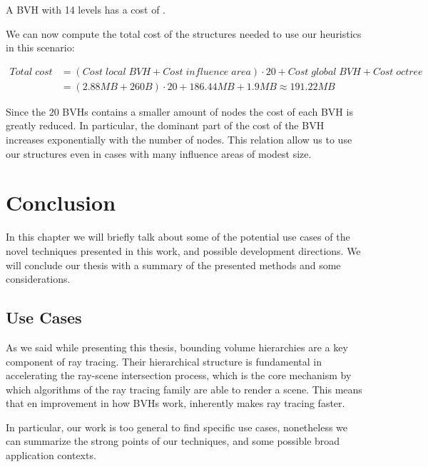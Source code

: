 \documentclass{PoliMi_MasterThesis}
\begin{document}
A BVH with 14 levels has a cost of \unboldmath.

We can now compute the total cost of the structures needed to use our heuristics in this scenario:

\begin{subequations}
	\begin{align*}
		Total\;cost &= (Cost\;local\;BVH + Cost\;influence\;area) \cdot 20 + Cost\;global\;BVH + Cost\;octree\\
		&= (2.88MB + 260B) \cdot 20 + 186.44MB + 1.9MB \approx 191.22MB
	\end{align*}
\end{subequations}

Since the $20$ BVHs contains a smaller amount of nodes the cost of each BVH is greatly reduced. In particular, the dominant part of the cost of the BVH increases exponentially with the number of nodes. This relation allow us to use our structures even in cases with many influence areas of modest size.

\chapter{Conclusion} \label{ch:conclusion}
In this chapter we will briefly talk about some of the potential use cases of the novel techniques presented in this work, and possible development directions. We will conclude our thesis with a summary of the presented methods and some considerations.

\section{Use Cases} \label{sec:use_cases}
As we said while presenting this thesis, bounding volume hierarchies are a key component of ray tracing. Their hierarchical structure is fundamental in accelerating the ray-scene intersection process, which is the core mechanism by which algorithms of the ray tracing family are able to render a scene. This means that en improvement in how BVHs work, inherently makes ray tracing faster.

In particular, our work is too general to find specific use cases, nonetheless we can summarize the strong points of our techniques, and some possible broad application contexts.
\end{document}

